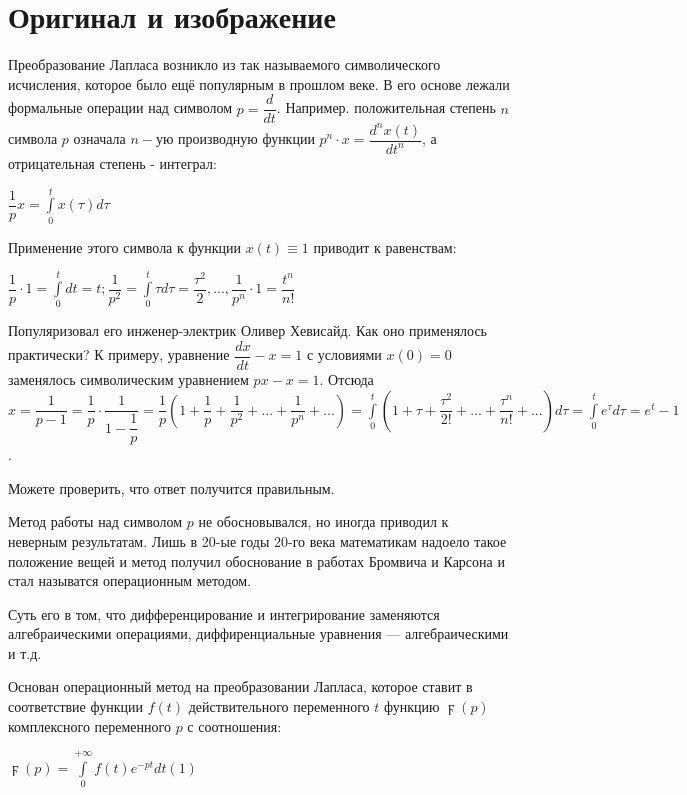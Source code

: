 \documentclass[a4paper, 12pt]{report}
\begin{document}
\section{Оригинал и изображение}
Преобразование Лапласа возникло из так называемого символического исчисления, которое было ещё популярным в прошлом веке. В его основе лежали формальные операции над символом $p = \dfrac{d}{dt}$. Например. положительная степень $n$ символа $p$ означала $n - $ую производную функции $p^n\cdot x = \dfrac{d^nx(t)}{dt^n}$, а отрицательная степень - интеграл:

\begin{center}
    $\dfrac{1}{p}x = \int\limits_0^tx(\tau)d\tau$
\end{center}

Применение этого символа к функции $x(t) \equiv 1$ приводит к равенствам:

\begin{center}
    $\dfrac{1}{p}\cdot1 = \int\limits_0^tdt = t; \dfrac{1}{p^2} = \int\limits_0^t\tau d\tau = \dfrac{\tau^2}{2}, ..., \dfrac{1}{p^n}\cdot1 = \dfrac{t^n}{n!}$
\end{center}

Популяризовал его инженер-электрик Оливер Хевисайд. Как оно применялось практически? К примеру, уравнение $\dfrac{dx}{dt} - x = 1$ с условиями $x(0) = 0$ заменялось символическим уравнением $px - x = 1$. Отсюда $x = \dfrac{1}{p - 1} = \dfrac{1}{p} \cdot \dfrac{1}{1 - \dfrac{1}{p}} = \dfrac{1}{p}(1 + \dfrac{1}{p} + \dfrac{1}{p^2} + ... + \dfrac{1}{p^n} + ...) = \int\limits_0^t(1 + \tau + \dfrac{\tau^2}{2!} + ... + \dfrac{\tau^n}{n!} + ...)d\tau = \int\limits_0^t e^{\tau}d\tau = e^t - 1$.\par Можете проверить, что ответ получится правильным.
\par\bigskip
Метод работы над символом $p$ не обосновывался, но иногда приводил к неверным результатам. Лишь в 20-ые годы 20-го века математикам надоело такое положение вещей и метод получил обоснование в работах Бромвича и Карсона и стал называтся операционным методом.

Суть его в том, что дифференцирование и интегрирование заменяются алгебраическими операциями, диффиренциальные уравнения --- алгебраическими и т.д.

Основан операционный метод на преобразовании Лапласа, которое ставит в соответствие функции $f(t)$ действительного переменного $t$ функцию $\digamma(p)$ комплексного переменного $p$ с соотношения:

\begin{center}
    $\digamma(p) = \int\limits_0^{+\infty}f(t)e^{-pt}dt (1)$
\end{center}
\end{document}

